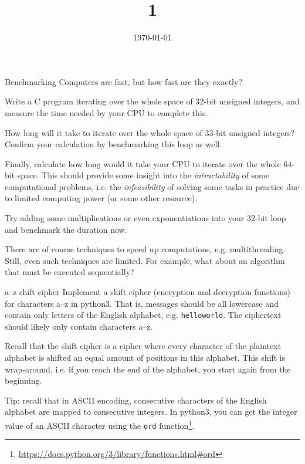 \documentclass{practice}
\title{1}
\date{\today}
\begin{document}
\maketitle

\begin{task}{Benchmarking}
  Computers are fast, but how fast are they exactly?

  Write a C program iterating over the whole space of $32$-bit unsigned integers, and measure the time needed by your CPU to complete this.

  How long will it take to iterate over the whole space of $33$-bit unsigned integers?
  Confirm your calculation by benchmarking this loop as well.

  Finally, calculate how long would it take your CPU to iterate over the whole $64$-bit space.
  This should provide some insight into the \emph{intractability} of some computational problems, i.e. the \emph{infeasibility} of solving some tasks in practice due to limited computing power (or some other resource).

  Try adding some multiplications or even exponentiations into your $32$-bit loop and benchmark the duration now.

  There are of course techniques to speed up computations, e.g. multithreading.
  Still, even such techniques are limited.
  For example, what about an algorithm that must be executed sequentially?
\end{task}

\begin{task}{a--z shift cipher}
  Implement a shift cipher (encryption and decryption functions) for characters a--z in python3.
  That is, messages should be all lowercase and contain only letters of the English alphabet, e.g. \texttt{helloworld}.
  The ciphertext should likely only contain characters a--z.

  Recall that the shift cipher is a cipher where every character of the plaintext alphabet is shifted an equal amount of positions in this alphabet.
  This shift is wrap-around, i.e. if you reach the end of the alphabet, you start again from the beginning.

  Tip:
  recall that in ASCII encoding, consecutive characters of the English alphabet are mapped to consecutive integers.
  In python3, you can get the integer value of an ASCII character using the \texttt{ord} function\footnote{\url{https://docs.python.org/3/library/functions.html\#ord}}.
\end{task}
\end{document}
